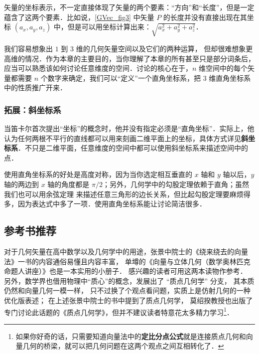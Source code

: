 矢量的坐标表示，不一定直接体现了矢量的两个要素：“方向”和“长度”，但是一定蕴含了这两个要素．比如说，\autoref{GVec_fig3} 中矢量 $P$ 的长度并没有直接出现在其坐标 $(a_x, a_y, a_z)$ 中，但是可以用坐标计算出来：$\sqrt{a_x^2+a_y^2+a_z^2}$．

我们容易想象出 $1$ 到 $3$ 维的几何矢量空间以及它们的两种运算， 但却很难想象更高维的情况．作为本章的主要目的，当你理解了本章的所有甚至只是部分词条后，应当可以熟悉该如何讨论任意维度的空间．讨论的核心在于，$n$ 维空间中的每个矢量都需要 $n$ 个数字来确定，我们可以“定义”一个直角坐标系，把 $3$ 维直角坐标系中的性质推广开来．

\subsubsection{拓展：斜坐标系}

当笛卡尔首次提出“坐标”的概念时，他并没有指定必须是“直角坐标”．实际上，他认为任何两根不平行的直线都可以用来刻画二维平面上的坐标，具体方式详见\textbf{斜坐标系}．不只是二维平面，任意维度的空间中都可以使用斜坐标系来描述空间中的点．

使用直角坐标系的好处是高度对称，因为当你选定相互垂直的 $x$ 轴和 $y$ 轴以后，$y$ 轴的两边到 $x$ 轴的角度都是 $\pi/2$；另外，几何学中的勾股定理依赖于直角；虽然我们也可以用余弦定理%
来描述任意三角形的边长关系，但比起勾股定理要麻烦得多，因为表达式中多了一项．使用直角坐标系能让讨论简洁很多．

\subsection{参考书推荐}
对于几何矢量在高中数学以及几何学中的用途，张景中院士的《绕来绕去的向量法》一书的内容通俗易懂且内容丰富， 单墫的《向量与立体几何（数学奥林匹克命题人讲座）》也是一本实用的小册子． 感兴趣的读者可用这两本读物作参考． 另外，数学界也借用物理中“质心”的概念，发展出了 “质点几何学” 分支， 其本质仍然和向量几何一模一样， 只不过换了个观点看问题，实质上是仿射几何的一种优化版表述； 在上述张景中院士的书中提到了质点几何学， 莫绍揆教授也出版了专门讨论此话题的《质点几何学》，但并不建议读者特意花太多精力学习\footnote{如果你好奇的话，只需要知道向量法中的\textbf{定比分点公式}就是连接质点几何和向量几何的桥梁，就可以把几何问题在这两个观点之间互相转化了．}．
